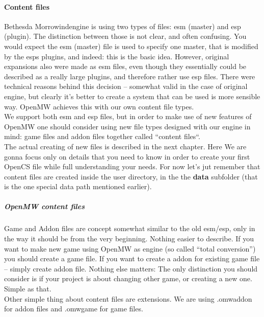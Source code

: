 \paragraph{Content files}
Bethesda Morrowind\texttrademark engine is using two types of files: esm (master) and esp (plugin). The distinction between those is not clear, and often confusing. You would expect the esm (master) file is used to specify one master, that is modified by the esps plugins, and indeed: this is the basic idea. However, original expansions also were made as esm files, even though they essentially could be described as a really large plugins, and therefore rather use esp files. There were technical reasons behind this decision -- somewhat valid in the case of original engine, but clearly it's better to create a system that can be used is more sensible way. Open{MW} achieves this with our own content file types.\\
We support both esm and esp files, but in order to make use of new features of OpenMW one should consider using new file types designed with our engine in mind: game files and addon files together called ``content files``.\\

The actual creating of new files is described in the next chapter. Here We are gonna focus only on details that you need to know in order to create your first Open{CS} file while full understanding your needs. For now let's jut remember that content files are created inside the user directory, in the the \textbf{data} subfolder (that is the one special data path mentioned earlier).\\
\subparagraph{Open{MW} content files}
Game and Addon files are concept somewhat similar to the old esm/esp, only in the way it should be from the very beginning. Nothing easier to describe. If you want to make new game using Open{MW} as engine (so called ``total conversion'') you should create a game file. If you want to create a addon for existing game file -- simply create addon file. Nothing else matters: The only distinction you should consider is if your project is about changing other game, or creating a new one. Simple as that.\\

Other simple thing about content files are extensions. We are using .omwaddon for addon files and .omwgame for game files.\\


